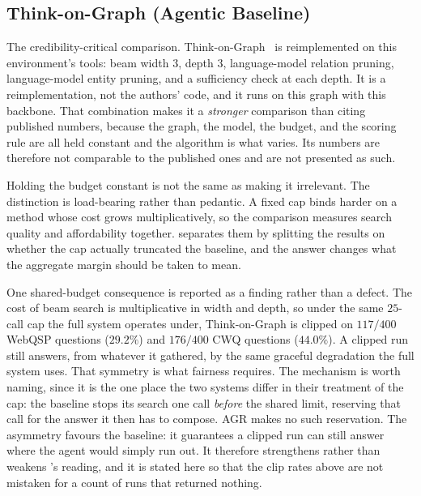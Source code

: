 \subsection{Think-on-Graph (Agentic Baseline)}\label{sec:baseline-tog}

The credibility-critical comparison. Think-on-Graph~\cite{sun2024think}
is reimplemented on this environment's tools: beam width
$3$, depth $3$, language-model relation pruning, language-model entity pruning,
and a sufficiency check at each depth. It is a reimplementation, not the
authors' code, and it runs on this graph with this backbone. That combination
makes it a \emph{stronger} comparison than citing published numbers, because the
graph, the model, the budget, and the scoring rule are all held constant and the
algorithm is what varies. Its numbers are therefore not comparable to the
published ones and are not presented as such.

Holding the budget constant is not the same as making it irrelevant. The
distinction is load-bearing rather than pedantic. A fixed cap binds harder on a
method whose cost grows multiplicatively, so the comparison measures search
quality and affordability together.  separates them by
splitting the results on whether the cap actually truncated the baseline, and
the answer changes what the aggregate margin should be taken to mean.

One shared-budget consequence is reported as a finding rather than a defect. The
cost of beam search is multiplicative in width and depth, so under the same
$25$-call cap the full system operates under, Think-on-Graph is clipped on
$117/400$ WebQSP questions ($29.2\%$) and $176/400$ CWQ questions ($44.0\%$). A
clipped run still answers, from whatever it gathered, by the same graceful
degradation the full system uses. That symmetry is what fairness requires. The
mechanism is worth naming, since it is the one place the two systems differ in
their treatment of the cap: the baseline stops its search one call \emph{before}
the shared limit, reserving that call for the answer it then has to compose. AGR
makes no such reservation. The asymmetry favours the baseline: it guarantees
a clipped run can still answer where the agent would simply run out. It
therefore strengthens rather than weakens 's reading, and it
is stated here so that the clip rates above are not mistaken for a count of runs
that returned nothing.

